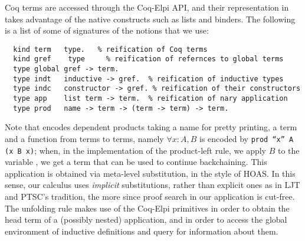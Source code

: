 
Coq terms are accessed through the Coq-Elpi API, and their representation
in \lP takes advantage of the native \lP constructs such as lists and binders.
The following is a list of some of signatures of the notions that we use:
\begin{lstlisting}
  kind term   type.   % reification of Coq terms
  kind gref    type     % reification of refernces to global terms
  type global gref -> term.
  type indt   inductive -> gref.  % reification of inductive types
  type indc   constructor -> gref. % reification of their constructors 
  type app    list term -> term.  % reification of nary application
  type prod   name -> term -> (term -> term) -> term.
\end{lstlisting}

Note that  encodes dependent products taking a name for pretty printing,  a term and a \lP function from
terms to terms, namely $\forall x : A, B$ is encoded by \texttt{prod ``x'' A (x\ B x)};
when, in the implementation of the product-left rule, we
apply $B$ to the variable ,
we get a term that can be used to continue backchaining. This
application is obtained via meta-level substitution, in the style of HOAS. In this sense, our calculus uses \emph{implicit} substitutions, rather than explicit ones as in LJT and PTSC's tradition, the more since proof search in our application is cut-free. 
The unfolding rule makes use of the Coq-Elpi primitives
 in order to obtain the head term of a (possibly
nested) application, and  in order to access the global
environment of inductive definitions and query for information about them.



